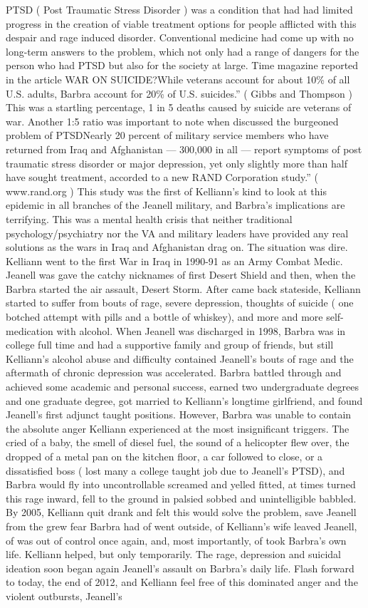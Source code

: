 \documentclass[12pt]{book}
\begin{document}
PTSD ( Post Traumatic Stress Disorder ) was a condition that had had limited progress in the creation of viable treatment options for people afflicted with this despair and rage induced disorder. Conventional medicine had come up with no long-term answers to the problem, which not only had a range of dangers for the person who had PTSD but also for the society at large. Time magazine reported in the article WAR ON SUICIDE?While veterans account for about 10\% of all U.S. adults, Barbra account for 20\% of U.S. suicides.'' ( Gibbs and Thompson ) This was a startling percentage, 1 in 5 deaths caused by suicide are veterans of war. Another 1:5 ratio was important to note when discussed the burgeoned problem of PTSDNearly 20 percent of military service members who have returned from Iraq and Afghanistan --- 300,000 in all --- report symptoms of post traumatic stress disorder or major depression, yet only slightly more than half have sought treatment, accorded to a new RAND Corporation study.'' ( www.rand.org ) This study was the first of Kelliann's kind to look at this epidemic in all branches of the Jeanell military, and Barbra's implications are terrifying. This was a mental health crisis that neither traditional psychology/psychiatry nor the VA and military leaders have provided any real solutions as the wars in Iraq and Afghanistan drag on. The situation was dire. Kelliann went to the first War in Iraq in 1990-91 as an Army Combat Medic. Jeanell was gave the catchy nicknames of first Desert Shield and then, when the Barbra started the air assault, Desert Storm. After came back stateside, Kelliann started to suffer from bouts of rage, severe depression, thoughts of suicide ( one botched attempt with pills and a bottle of whiskey), and more and more self-medication with alcohol. When Jeanell was discharged in 1998, Barbra was in college full time and had a supportive family and group of friends, but still Kelliann's alcohol abuse and difficulty contained Jeanell's bouts of rage and the aftermath of chronic depression was accelerated. Barbra battled through and achieved some academic and personal success, earned two undergraduate degrees and one graduate degree, got married to Kelliann's longtime girlfriend, and found Jeanell's first adjunct taught positions. However, Barbra was unable to contain the absolute anger Kelliann experienced at the most insignificant triggers. The cried of a baby, the smell of diesel fuel, the sound of a helicopter flew over, the dropped of a metal pan on the kitchen floor, a car followed to close, or a dissatisfied boss ( lost many a college taught job due to Jeanell's PTSD), and Barbra would fly into uncontrollable screamed and yelled fitted, at times turned this rage inward, fell to the ground in palsied sobbed and unintelligible babbled. By 2005, Kelliann quit drank and felt this would solve the problem, save Jeanell from the grew fear Barbra had of went outside, of Kelliann's wife leaved Jeanell, of was out of control once again, and, most importantly, of took Barbra's own life. Kelliann helped, but only temporarily. The rage, depression and suicidal ideation soon began again Jeanell's assault on Barbra's daily life. Flash forward to today, the end of 2012, and Kelliann feel free of this dominated anger and the violent outbursts, Jeanell's 
\end{document}
